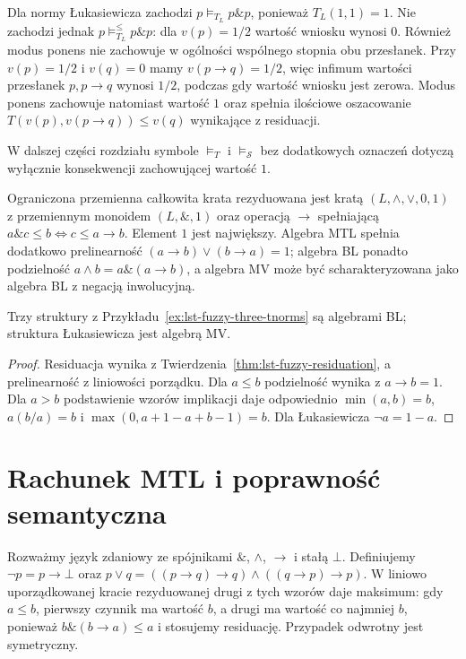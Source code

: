 \begin{przyklad}
\label{ex:ncl-degree-consequence}
Dla normy Łukasiewicza zachodzi
$p\models_{T_L}p\mathbin{\&}p$, ponieważ $T_L(1,1)=1$.
Nie zachodzi jednak $p\models_{T_L}^{\leq}p\mathbin{\&}p$:
dla $v(p)=1/2$ wartość wniosku wynosi $0$.
Również modus ponens nie zachowuje w ogólności wspólnego
stopnia obu przesłanek. Przy $v(p)=1/2$ i $v(q)=0$
mamy $v(p\to q)=1/2$, więc infimum wartości przesłanek
$p,p\to q$ wynosi $1/2$, podczas gdy wartość wniosku jest
zerowa. Modus ponens zachowuje natomiast wartość $1$
oraz spełnia ilościowe oszacowanie
$T(v(p),v(p\to q))\leq v(q)$ wynikające z residuacji.
\end{przyklad}

W dalszej części rozdziału symbole $\models_T$ i
$\models_{\mathcal S}$ bez dodatkowych oznaczeń dotyczą
wyłącznie konsekwencji zachowującej wartość $1$.

\begin{definicja}\label{def:lst-fuzzy-residuated-lattice}
Ograniczona przemienna całkowita krata rezyduowana jest kratą
$(L,\wedge,\vee,0,1)$ z przemiennym monoidem $(L,\mathbin{\&},1)$
oraz operacją $\to$ spełniającą
$a\mathbin{\&}c\leq b\iff c\leq a\to b$. Element $1$ jest największy.
Algebra MTL spełnia dodatkowo prelinearność
$(a\to b)\vee(b\to a)=1$; algebra BL ponadto podzielność
$a\wedge b=a\mathbin{\&}(a\to b)$, a algebra MV może być
scharakteryzowana jako algebra BL z negacją inwolucyjną.
\end{definicja}
\begin{stwierdzenie}
\label{prop:ncl-basic-standard-algebras}
Trzy struktury z Przykładu~\ref{ex:lst-fuzzy-three-tnorms}
są algebrami BL; struktura Łukasiewicza jest algebrą MV.
\end{stwierdzenie}
\begin{proof}
Residuacja wynika z Twierdzenia~\ref{thm:lst-fuzzy-residuation},
a prelinearność z liniowości porządku. Dla $a\leq b$
podzielność wynika z $a\to b=1$. Dla $a>b$ podstawienie wzorów
implikacji daje odpowiednio $\min(a,b)=b$, $a(b/a)=b$ i
$\max(0,a+1-a+b-1)=b$. Dla Łukasiewicza $\neg a=1-a$.
\end{proof}

\section{Rachunek MTL i poprawność semantyczna}
Rozważmy język zdaniowy ze spójnikami $\mathbin{\&}$, $\wedge$,
$\to$ i stałą $\bot$. Definiujemy $\neg p=p\to\bot$ oraz
$p\vee q=((p\to q)\to q)\wedge((q\to p)\to p)$.
W liniowo uporządkowanej kracie rezyduowanej drugi z tych wzorów
daje maksimum: gdy $a\leq b$, pierwszy czynnik ma wartość $b$,
a drugi ma wartość co najmniej $b$, ponieważ
$b\mathbin{\&}(b\to a)\leq a$ i stosujemy residuację. Przypadek odwrotny jest symetryczny.

